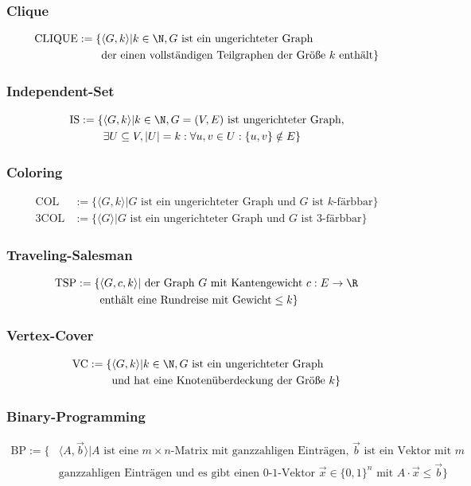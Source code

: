 \documentclass{article}
\begin{document}
\subsubsection{Clique}
\begin{align*}
	\text{CLIQUE}:=\{&\langle G, k \rangle|k\in \N, G \text{ ist ein ungerichteter Graph} \\
	&\text{der einen vollständigen Teilgraphen der Größe } k \text{ enthält}\}
\end{align*}
\subsubsection{Independent-Set}
\begin{align*}
	\text{IS}:=\{&\langle G, k \rangle|k\in \N, G = (V,E) \text{ ist ungerichteter Graph}, \\
	&\exists U\subseteq V, |U|=k:\forall u, v\in U:\{u, v\}\notin E\}
\end{align*}
\subsubsection{Coloring}
\begin{align*}
	\text{COL}&:=\{\langle G, k\rangle|G \text{ ist ein ungerichteter Graph und } G \text{ ist } k\text{-färbbar}\} \\
	\text{3COL}&:=\{\langle G \rangle|G \text{ ist ein ungerichteter Graph und } G \text{ ist 3-färbbar}\}
\end{align*}
\subsubsection{Traveling-Salesman}
\begin{align*}
	\text{TSP}:=\{&\langle G, c, k\rangle|\text{ der Graph } G \text{ mit Kantengewicht } c:E\to\R \\
		& \text{enthält eine Rundreise mit Gewicht} \leq k\}
\end{align*}
\subsubsection{Vertex-Cover}
\begin{align*}
	\text{VC}:=\{&\langle G, k\rangle|k\in\N, G \text{ ist ein ungerichteter Graph} \\
	&\text{und hat eine Knotenüberdeckung der Größe } k\}
\end{align*}
\subsubsection{Binary-Programming}
\begin{align*}
	\text{BP}:=\{&\langle A, \vec{b}\rangle|A \text{ ist eine } m\times n \text{-Matrix mit ganzzahligen Einträgen, }\vec{b} \text{ ist ein Vektor mit } m \\
	&\text{ganzzahligen Einträgen und es gibt einen 0-1-Vektor } \vec{x}\in\{0,1\}^n \text{ mit } A\cdot\vec{x}\leq\vec{b}\}
\end{align*}
\end{document}
